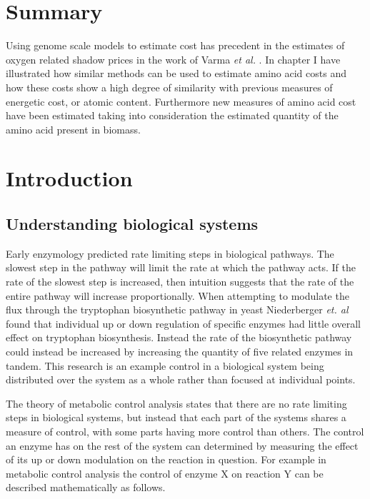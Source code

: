 \section*{Summary}

Using genome scale models to estimate cost has precedent in the estimates of oxygen related shadow prices in the work of Varma \emph{et al.} \cite{varma1993}. In chapter I have illustrated how similar methods can be used to estimate amino acid costs and how these costs show a high degree of similarity with previous measures of energetic cost, or atomic content. Furthermore new measures of amino acid cost have been estimated taking into consideration the estimated quantity of the amino acid present in biomass.

\clearpage

\section{Introduction}

\subsection{Understanding biological systems}

Early enzymology predicted rate limiting steps in biological pathways. The slowest step in the pathway will limit the rate at which the pathway acts. If the rate of the slowest step is increased, then intuition suggests that the rate of the entire pathway will increase proportionally. When attempting to modulate the flux through the tryptophan biosynthetic pathway in yeast Niederberger \emph{et. al} \cite{niederberger1992} found that individual up or down regulation of specific enzymes had little overall effect on tryptophan biosynthesis. Instead the rate of the biosynthetic pathway could instead be increased by increasing the quantity of five related enzymes in tandem. This research is an example control in a biological system being distributed over the system as a whole rather than focused at individual points.

The theory of metabolic control analysis \cite{fell} states that there are no rate limiting steps in biological systems, but instead that each part of the systems shares a measure of control, with some parts having more control than others. The control an enzyme has on the rest of the system can determined by measuring the effect of its up or down modulation on the reaction in question. For example in metabolic control analysis the control of enzyme X on reaction Y can be described mathematically as follows.

